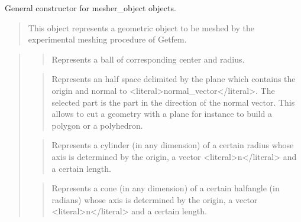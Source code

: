 \documentclass[a4paper,11pt,english]{sphinxmanual}
\begin{document}
\sphinxAtStartPar
{}

\sphinxAtStartPar
General constructor for mesher\_object objects.
\begin{quote}

\sphinxAtStartPar
This object represents a geometric object to be meshed by the
experimental meshing procedure of Getfem.
\end{quote}

\sphinxAtStartPar
{}
\begin{quote}

\sphinxAtStartPar
{}
\begin{quote}

\sphinxAtStartPar
Represents a ball of corresponding center and radius.
\end{quote}

\sphinxAtStartPar
{}
\begin{quote}

\sphinxAtStartPar
Represents an half space delimited by the plane which contains the
origin and normal to \textless{}literal\textgreater{}normal\_vector\textless{}/literal\textgreater{}. The selected part is the part
in the direction of the normal vector. This allows to cut a geometry
with a plane for instance to build a polygon or a polyhedron.
\end{quote}

\sphinxAtStartPar
{}
\begin{quote}

\sphinxAtStartPar
Represents a cylinder (in any dimension) of a certain radius whose axis
is determined by the origin, a vector \textless{}literal\textgreater{}n\textless{}/literal\textgreater{} and a certain length.
\end{quote}

\sphinxAtStartPar
{}
\begin{quote}

\sphinxAtStartPar
Represents a cone (in any dimension) of a certain half\sphinxhyphen{}angle (in radians)
whose axis is determined by the origin, a vector \textless{}literal\textgreater{}n\textless{}/literal\textgreater{} and a certain length.
\end{quote}


\end{quote}
\end{document}
